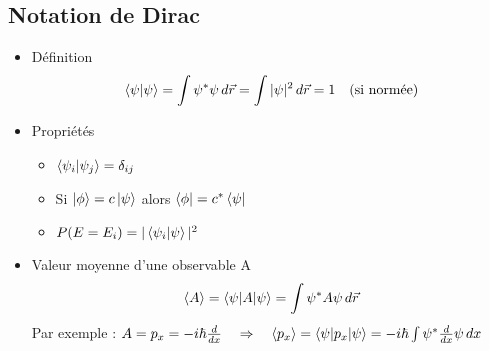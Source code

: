 \subsection*{Notation de Dirac}
\begin{itemize}
	\item Définition 
	      \begin{equation}
	      	\braket{\psi | \psi} =  \int \psi ^* \psi \, d\vec{r} = \int |\psi |^2 \, d\vec{r}= 1 \quad \mbox{(si normée)}
	      \end{equation}
	      	
	\item Propriétés 
	      \begin{itemize}
	      	\item $\braket{\psi _i | \psi _j} = \delta _{ij}$
	      	\item Si $\ket{\phi} = c\ket{\psi}$ alors $\bra{\phi} = c^* \bra{\psi}$
	      	\item $P(E = E_i) = | \braket{\psi _i | \psi} |^2$
	      \end{itemize}
	      
	\item Valeur moyenne d'une observable A
	      \begin{equation}
	      	\braket{A} = \braket{\psi | A | \psi} = \int \psi ^* A \psi \, d\vec{r}
	      \end{equation}
	      Par exemple : $A = p_x = -i \hbar \frac{d}{dx} \quad \Rightarrow \quad  \braket{p_x} = \braket{\psi | p_x | \psi} = -i\hbar \int \psi^* \frac{d}{dx} \psi \, dx$
\end{itemize}